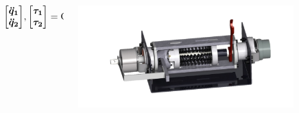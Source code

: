 \documentclass[10pt]{beamer}
\begin{document}
\begin{frame}[allowframebreaks]
\begin{figure}[H]
\begin{columns}[T]
\begin{column}{.7\textwidth}
			\begin{equation}
			\boldsymbol{\begin{bmatrix} \ddot{q}_1 \\ \ddot{q}_2	\end{bmatrix}}, \boldsymbol{\begin{bmatrix} \tau_1 \\ \tau_2	\end{bmatrix}} = \mathrm{CHDA}\left( model,\boldsymbol{q,\dot{q},\begin{bmatrix} 0 \\ \ddot{q}_2	\end{bmatrix},\begin{bmatrix} \tau_1 \\ 0	\end{bmatrix}}\right)
			\end{equation}
		\end{column}
		\begin{column}{.3\textwidth}
    		\includegraphics[width=\textwidth]{figs/actionneurRaideurVariable}\\

\end{column}
\end{columns}
\end{figure}
\end{frame}
\end{document}

